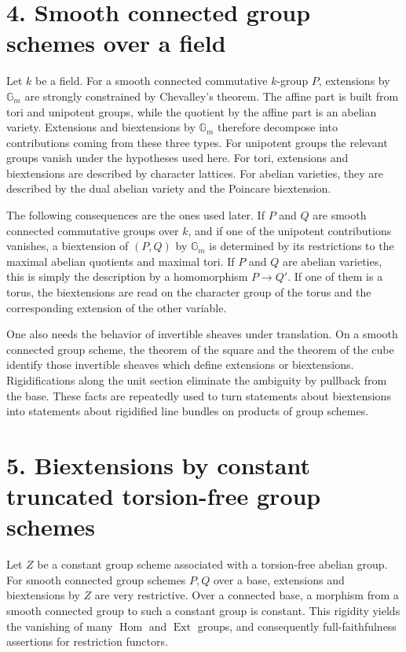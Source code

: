 \documentclass[11pt]{article}
\providecommand{\Gm}{\mathbb G_m}
\providecommand{\Hom}{\operatorname{Hom}}
\providecommand{\Ext}{\operatorname{Ext}}
\begin{document}
\section*{4. Smooth connected group schemes over a field}

Let \(k\) be a field.  For a smooth connected commutative \(k\)-group \(P\), extensions by \(\Gm\) are strongly constrained by Chevalley's theorem.  The affine part is built from tori and unipotent groups, while the quotient by the affine part is an abelian variety.  Extensions and biextensions by \(\Gm\) therefore decompose into contributions coming from these three types.  For unipotent groups the relevant groups vanish under the hypotheses used here.  For tori, extensions and biextensions are described by character lattices.  For abelian varieties, they are described by the dual abelian variety and the Poincare biextension.

The following consequences are the ones used later.  If \(P\) and \(Q\) are smooth connected commutative groups over \(k\), and if one of the unipotent contributions vanishes, a biextension of \((P,Q)\) by \(\Gm\) is determined by its restrictions to the maximal abelian quotients and maximal tori.  If \(P\) and \(Q\) are abelian varieties, this is simply the description by a homomorphism \(P\to Q'\).  If one of them is a torus, the biextensions are read on the character group of the torus and the corresponding extension of the other variable.

One also needs the behavior of invertible sheaves under translation.  On a smooth connected group scheme, the theorem of the square and the theorem of the cube identify those invertible sheaves which define extensions or biextensions.  Rigidifications along the unit section eliminate the ambiguity by pullback from the base.  These facts are repeatedly used to turn statements about biextensions into statements about rigidified line bundles on products of group schemes.

\section*{5. Biextensions by constant truncated torsion-free group schemes}

Let \(Z\) be a constant group scheme associated with a torsion-free abelian group.  For smooth connected group schemes \(P,Q\) over a base, extensions and biextensions by \(Z\) are very restrictive.  Over a connected base, a morphism from a smooth connected group to such a constant group is constant.  This rigidity yields the vanishing of many \(\Hom\) and \(\Ext\) groups, and consequently full-faithfulness assertions for restriction functors.
\end{document}
